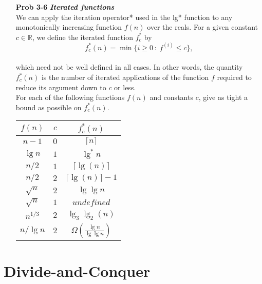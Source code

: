 \documentclass[fontsize=12pt,paper=a4]{book}
\begin{document}
\begin{enumerate}
	\item[\textbf{Prob 3-6}]
		\textbf{\textit{Iterated functions}}\\
			We can apply the iteration operator* used in the lg* function to any monotonically increasing function $f(n)$ over the reals. For a given constant $c \in \mathbb{R}$, we define the iterated function $f_c^*$ by\\
			\[ f_c^*(n) = \min\{ i \geq 0\ :\ f^{(i)} \leq c\},\] \\
			which need not be well defined in all cases. In other words, the quantity $f_c^*(n)$ is the number of iterated applications of the function $f$ required to reduce its argument down to $c$ or less.\\
			For each of the following functions $f(n)$ and constants $c$, give as tight a bound as possible on $f_c^*(n)$. \\
			\begin{tabular}{c c | c |}
				$f(n)$ & $c$ & $f_c^*(n)$ \\
				\hline
				$n-1$ & $0$ & $\lceil n \rceil$ \\
				\hline
				$\lg n$ & $1$ & $\lg^* n$ \\
				\hline
				$n/2$ & $1$ & $\lceil \lg(n) \rceil$ \\
				\hline
				$n/2$ & $2$ & $\lceil \lg(n) \rceil - 1$\\
				\hline
				$\sqrt{n}$ & $2$ & $\lg \lg n$\\ 
				\hline
				$\sqrt{n}$ & $1$ & $undefined$\\
				\hline
				$n^{1/3}$ & $2$ & $\lg_3 \lg_2 (n)$\\
				\hline
				$n/\lg n$ & $2$ & $\Omega(\frac{\lg n}{\lg \lg n})$\\
				\hline
			\end{tabular}
	
\end{enumerate}

\chapter{Divide-and-Conquer}
\end{document}
